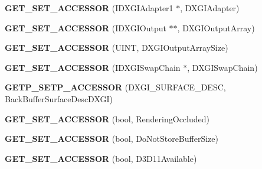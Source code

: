 \begin{DoxyCompactItemize}
\item 
\hypertarget{class_d_x_u_t_state_a83c7f014179f536e96ce9e444da0be0a}{{\bfseries G\+E\+T\+\_\+\+S\+E\+T\+\_\+\+A\+C\+C\+E\+S\+S\+O\+R} (I\+D\+X\+G\+I\+Adapter1 $\ast$, D\+X\+G\+I\+Adapter)}\label{class_d_x_u_t_state_a83c7f014179f536e96ce9e444da0be0a}

\item 
\hypertarget{class_d_x_u_t_state_a1f2404c4bf50dbd9180da60f7ef9746f}{{\bfseries G\+E\+T\+\_\+\+S\+E\+T\+\_\+\+A\+C\+C\+E\+S\+S\+O\+R} (I\+D\+X\+G\+I\+Output $\ast$$\ast$, D\+X\+G\+I\+Output\+Array)}\label{class_d_x_u_t_state_a1f2404c4bf50dbd9180da60f7ef9746f}

\item 
\hypertarget{class_d_x_u_t_state_a5f5807e285ea2db0cf95a1219f957fb3}{{\bfseries G\+E\+T\+\_\+\+S\+E\+T\+\_\+\+A\+C\+C\+E\+S\+S\+O\+R} (U\+I\+N\+T, D\+X\+G\+I\+Output\+Array\+Size)}\label{class_d_x_u_t_state_a5f5807e285ea2db0cf95a1219f957fb3}

\item 
\hypertarget{class_d_x_u_t_state_a61a909e316093047a88e77af9114e01d}{{\bfseries G\+E\+T\+\_\+\+S\+E\+T\+\_\+\+A\+C\+C\+E\+S\+S\+O\+R} (I\+D\+X\+G\+I\+Swap\+Chain $\ast$, D\+X\+G\+I\+Swap\+Chain)}\label{class_d_x_u_t_state_a61a909e316093047a88e77af9114e01d}

\item 
\hypertarget{class_d_x_u_t_state_ac352649c0f50766113addf6fab59626e}{{\bfseries G\+E\+T\+P\+\_\+\+S\+E\+T\+P\+\_\+\+A\+C\+C\+E\+S\+S\+O\+R} (D\+X\+G\+I\+\_\+\+S\+U\+R\+F\+A\+C\+E\+\_\+\+D\+E\+S\+C, Back\+Buffer\+Surface\+Desc\+D\+X\+G\+I)}\label{class_d_x_u_t_state_ac352649c0f50766113addf6fab59626e}

\item 
\hypertarget{class_d_x_u_t_state_a9ed951a330826cda11758371a9181da8}{{\bfseries G\+E\+T\+\_\+\+S\+E\+T\+\_\+\+A\+C\+C\+E\+S\+S\+O\+R} (bool, Rendering\+Occluded)}\label{class_d_x_u_t_state_a9ed951a330826cda11758371a9181da8}

\item 
\hypertarget{class_d_x_u_t_state_a1d563446bb38f6b0678f5181d797767f}{{\bfseries G\+E\+T\+\_\+\+S\+E\+T\+\_\+\+A\+C\+C\+E\+S\+S\+O\+R} (bool, Do\+Not\+Store\+Buffer\+Size)}\label{class_d_x_u_t_state_a1d563446bb38f6b0678f5181d797767f}

\item 
\hypertarget{class_d_x_u_t_state_abdff8753328cb501332f10ac653e26a7}{{\bfseries G\+E\+T\+\_\+\+S\+E\+T\+\_\+\+A\+C\+C\+E\+S\+S\+O\+R} (bool, D3\+D11\+Available)}\label{class_d_x_u_t_state_abdff8753328cb501332f10ac653e26a7}


\end{DoxyCompactItemize}
